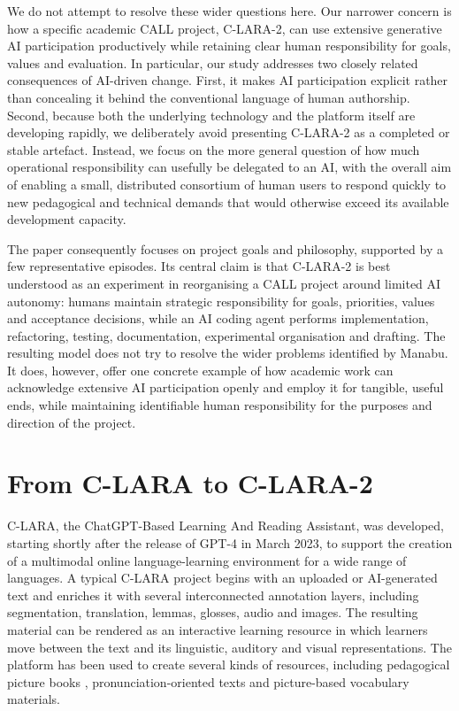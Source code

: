 \documentclass[11pt,a4paper]{article}
\begin{document}
We do not attempt to resolve these wider questions here. Our narrower concern is how a specific academic CALL project, C-LARA-2, can use extensive generative AI participation productively while retaining clear human responsibility for goals, values and evaluation. In particular, our study addresses two closely related consequences of AI-driven change. First, it makes AI participation explicit rather than concealing it behind the conventional language of human authorship. Second, because both the underlying technology and the platform itself are developing rapidly, we deliberately avoid presenting C-LARA-2 as a completed or stable artefact. Instead, we focus on the more general question of how much operational responsibility can usefully be delegated to an AI, with the overall aim of enabling a small, distributed consortium of human users to respond quickly to new pedagogical and technical demands that would otherwise exceed its available development capacity.

The paper consequently focuses on project goals and philosophy, supported by a few representative episodes. Its central claim is that C-LARA-2 is best understood as an experiment in reorganising a CALL project around limited AI autonomy: humans maintain strategic responsibility for goals, priorities, values and acceptance decisions, while an AI coding agent performs implementation, refactoring, testing, documentation, experimental organisation and drafting. The resulting model does not try to resolve the wider problems identified by Manabu. It does, however, offer one concrete example of how academic work can acknowledge extensive AI participation openly and employ it for tangible, useful ends, while maintaining identifiable human responsibility for the purposes and direction of the project.

\section{From C-LARA to C-LARA-2}

C-LARA, the ChatGPT-Based Learning And Reading Assistant, was developed, starting shortly after the release of GPT-4 in March 2023, to support the creation of a multimodal online language-learning environment for a wide range of languages. A typical C-LARA project begins with an uploaded or AI-generated text and enriches it with several interconnected annotation layers, including segmentation, translation, lemmas, glosses, audio and images. The resulting material can be rendered as an interactive learning resource in which learners move between the text and its linguistic, auditory and visual representations. The platform has been used to create several kinds of resources, including pedagogical picture books \citep{BediEtAl2025}, pronunciation-oriented texts and picture-based vocabulary materials.
\end{document}
